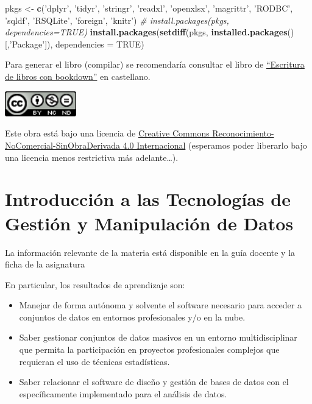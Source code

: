 \documentclass[
]{book}
\newenvironment{Shaded}{\begin{snugshade}}{\end{snugshade}}
\newcommand{\CommentTok}[1]{\textcolor[rgb]{0.56,0.35,0.01}{\textit{#1}}}
\newcommand{\DataTypeTok}[1]{\textcolor[rgb]{0.13,0.29,0.53}{#1}}
\newcommand{\KeywordTok}[1]{\textcolor[rgb]{0.13,0.29,0.53}{\textbf{#1}}}
\newcommand{\NormalTok}[1]{#1}
\newcommand{\OtherTok}[1]{\textcolor[rgb]{0.56,0.35,0.01}{#1}}
\newcommand{\StringTok}[1]{\textcolor[rgb]{0.31,0.60,0.02}{#1}}
\begin{document}
\begin{Shaded}
\begin{Highlighting}[]
\NormalTok{pkgs <-}\StringTok{ }\KeywordTok{c}\NormalTok{(}\StringTok{'dplyr'}\NormalTok{, }\StringTok{'tidyr'}\NormalTok{, }\StringTok{'stringr'}\NormalTok{, }\StringTok{'readxl'}\NormalTok{, }\StringTok{'openxlsx'}\NormalTok{, }\StringTok{'magrittr'}\NormalTok{, }
          \StringTok{'RODBC'}\NormalTok{, }\StringTok{'sqldf'}\NormalTok{, }\StringTok{'RSQLite'}\NormalTok{, }\StringTok{'foreign'}\NormalTok{, }\StringTok{'knitr'}\NormalTok{)}
\CommentTok{# install.packages(pkgs, dependencies=TRUE)}
\KeywordTok{install.packages}\NormalTok{(}\KeywordTok{setdiff}\NormalTok{(pkgs, }\KeywordTok{installed.packages}\NormalTok{()[,}\StringTok{'Package'}\NormalTok{]), }\DataTypeTok{dependencies =} \OtherTok{TRUE}\NormalTok{)}
\end{Highlighting}
\end{Shaded}

Para generar el libro (compilar) se recomendaría consultar el libro de \href{https://rubenfcasal.github.io/bookdown_intro}{``Escritura de libros con bookdown''} en castellano.

\includegraphics[width=1.22in]{images/by-nc-nd-88x31}

Este obra está bajo una licencia de \href{https://creativecommons.org/licenses/by-nc-nd/4.0/deed.es_ES}{Creative Commons Reconocimiento-NoComercial-SinObraDerivada 4.0 Internacional}
(esperamos poder liberarlo bajo una licencia menos restrictiva más adelante\ldots).

\hypertarget{introducciuxf3n-a-las-tecnologuxedas-de-gestiuxf3n-y-manipulaciuxf3n-de-datos}{%
\chapter{Introducción a las Tecnologías de Gestión y Manipulación de Datos}\label{introducciuxf3n-a-las-tecnologuxedas-de-gestiuxf3n-y-manipulaciuxf3n-de-datos}}

La información relevante de la materia está disponible en la guía docente y la ficha de la asignatura

En particular, los resultados de aprendizaje son:

\begin{itemize}
\item
  Manejar de forma autónoma y solvente el software necesario para acceder a conjuntos de datos en entornos profesionales y/o en la nube.
\item
  Saber gestionar conjuntos de datos masivos en un entorno multidisciplinar que permita la participación en proyectos profesionales complejos que requieran el uso de técnicas estadísticas.
\item
  Saber relacionar el software de diseño y gestión de bases de datos con el específicamente implementado para el análisis de datos.
\end{itemize}
\end{document}
